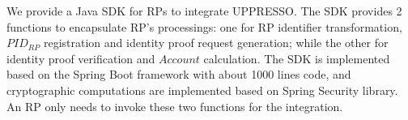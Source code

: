 


We provide a Java SDK for RPs to integrate UPPRESSO.
The SDK provides 2 functions to encapsulate RP's processings: one for  RP identifier transformation, $PID_{RP}$ registration and identity proof request generation; while the other for identity proof verification and $Account$ calculation. %
The SDK is implemented based on the Spring Boot framework  with about 1000 lines code, and cryptographic computations are implemented based on Spring Security library.
An RP only needs to invoke these two functions for the integration.


